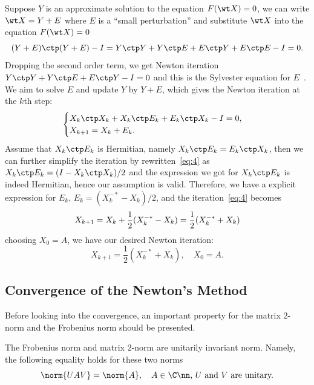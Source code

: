 \documentclass{article}
\numberwithin{equation}{section} %
\newcommand{\gnorm}[1]{\norm{#1}}
\begin{document}
Suppose $Y$ is an approximate solution to the equation $F(\wt X) = 0$, we
can write $\wt X = Y + E$ where $E$ is a ``small perturbation'' and
substitute $\wt X$ into the equation $F(\wt X) = 0$
\begin{equation}\notag
  (Y+E)\ctp (Y+E) - I = Y\ctp Y + Y\ctp E + E\ctp Y + E\ctp E - I = 0.
\end{equation}
Dropping the second order term, we get Newton iteration
$Y\ctp Y + Y\ctp E + E\ctp Y - I = 0$ and this is the Sylvester equation
for $E$~. We aim to solve $E$ and
update $Y$ by $Y + E$, which gives the Newton iteration at the $k$th step:
\begin{equation}\label{eq:4}
  \begin{cases}
    X_k \ctp X_{k} + X_{k}\ctp E_k + E_k\ctp X_k - I = 0,\\
    X_{k+1} = X_{k} + E_k.
  \end{cases}
\end{equation}
Assume that $X_k\ctp E_k$ is Hermitian, namely $X_k\ctp E_k = E_k\ctp X_k$,
then we can further simplify the iteration by rewritten~\eqref{eq:4} as
$X_k\ctp E_k = (I - X_k\ctp X_k)/2$ and the expression we got for
$X_k\ctp E_k$ is indeed Hermitian, hence our assumption is valid.
Therefore, we have a explicit expression for $E_k$,
$E_k = (X_k^{-*} - X_k)/2$, and the iteration~\eqref{eq:4} becomes
\begin{equation}\notag
  X_{k+1} = X_{k} + \frac 12 (X_k^{-*}-X_k) = \frac 12(X_k^{-*} + X_k)
\end{equation}
choosing $X_0 = A$, we have our desired Newton iteration:
\begin{equation}
  \label{eq:newton-iteration}
  X_{k+1} = \frac 12(X_k^{-*} + X_k),\quad X_0 = A.
\end{equation}

\subsection{Convergence of the Newton's Method}

Before looking into the convergence, an important property for the matrix
$2$-norm and the Frobenius norm should be presented.
\begin{theorem}
\label{thm:matrix-invariant-norm}
The Frobenius norm and matrix $2$-norm are unitarily invariant norm.
Namely, the following equality holds for these two norms
\begin{equation}\notag
  \gnorm{UAV} = \gnorm{A},\quad \text{$A\in\C\nn$, $U$ and $V$ are unitary.}
\end{equation}
\end{theorem}
  
\end{document}
